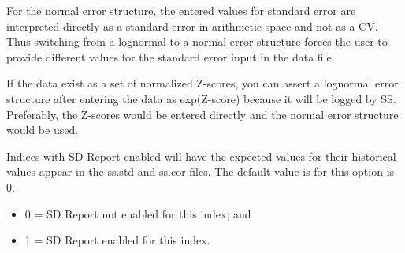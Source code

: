 For the normal error structure, the entered values for standard error are interpreted directly as a standard error in arithmetic space and not as a CV.  Thus switching from a lognormal to a normal error structure forces the user to provide different values for the standard error input in the data file.

If the data exist as a set of normalized Z-scores, you can assert a lognormal error structure after entering the data as exp(Z-score) because it will be logged by SS.  Preferably, the Z-scores would be entered directly and the normal error structure would be used.

Indices with SD Report enabled will have the expected values for their historical values appear in the ss.std and ss.cor files. The default value is for this option is 0.
	\begin{itemize}
		\item 0 = SD Report not enabled for this index; and
		\item 1 = SD Report enabled for this index.
	\end{itemize}



